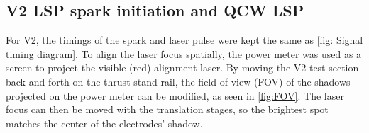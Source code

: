         \subsection{V2 LSP spark initiation and QCW LSP}

            For V2, the timings of the spark and laser pulse were kept the same as \autoref{fig: Signal timing diagram}. To align the laser focus spatially, the power meter was used as a screen to project the visible (red) alignment laser. By moving the V2 test section back and forth on the thrust stand rail, the field of view (FOV) of the shadows projected on the power meter can be modified, as seen in \autoref{fig:FOV}. The laser focus can then be moved with the translation stages, so the brightest spot matches the center of the electrodes' shadow.
            
